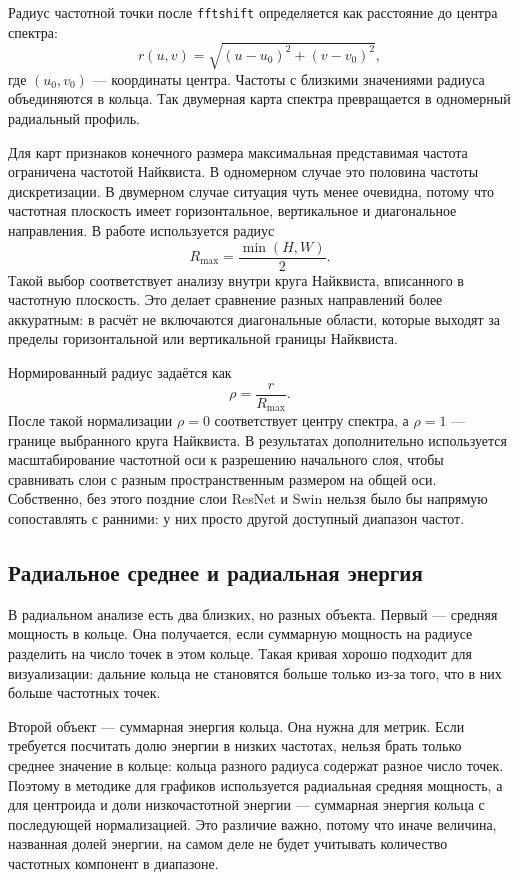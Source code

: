 Радиус частотной точки после \texttt{fftshift} определяется как расстояние до центра спектра:
\[
r(u,v)=\sqrt{(u-u_0)^2+(v-v_0)^2},
\]
где $(u_0,v_0)$ — координаты центра. Частоты с близкими значениями радиуса объединяются в кольца. Так двумерная карта спектра превращается в одномерный радиальный профиль.

Для карт признаков конечного размера максимальная представимая частота ограничена частотой Найквиста. В одномерном случае это половина частоты дискретизации. В двумерном случае ситуация чуть менее очевидна, потому что частотная плоскость имеет горизонтальное, вертикальное и диагональное направления. В работе используется радиус
\[
R_{\max}=\frac{\min(H,W)}{2}.
\]
Такой выбор соответствует анализу внутри круга Найквиста, вписанного в частотную плоскость. Это делает сравнение разных направлений более аккуратным: в расчёт не включаются диагональные области, которые выходят за пределы горизонтальной или вертикальной границы Найквиста.

Нормированный радиус задаётся как
\[
\rho=\frac{r}{R_{\max}}.
\]
После такой нормализации $\rho=0$ соответствует центру спектра, а $\rho=1$ — границе выбранного круга Найквиста. В результатах дополнительно используется масштабирование частотной оси к разрешению начального слоя, чтобы сравнивать слои с разным пространственным размером на общей оси. Собственно, без этого поздние слои ResNet и Swin нельзя было бы напрямую сопоставлять с ранними: у них просто другой доступный диапазон частот.

\subsection{Радиальное среднее и радиальная энергия}

В радиальном анализе есть два близких, но разных объекта. Первый — средняя мощность в кольце. Она получается, если суммарную мощность на радиусе разделить на число точек в этом кольце. Такая кривая хорошо подходит для визуализации: дальние кольца не становятся больше только из-за того, что в них больше частотных точек.

Второй объект — суммарная энергия кольца. Она нужна для метрик. Если требуется посчитать долю энергии в низких частотах, нельзя брать только среднее значение в кольце: кольца разного радиуса содержат разное число точек. Поэтому в методике для графиков используется радиальная средняя мощность, а для центроида и доли низкочастотной энергии — суммарная энергия кольца с последующей нормализацией. Это различие важно, потому что иначе величина, названная долей энергии, на самом деле не будет учитывать количество частотных компонент в диапазоне.


